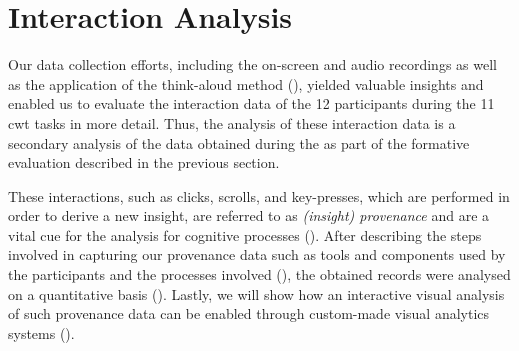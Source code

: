 \section{Interaction Analysis} \label{sec:interaction-analysis}
Our data collection efforts, including the on-screen and audio recordings as well as the application of the think-aloud method (), yielded valuable insights and enabled us to evaluate the interaction data of the 12 participants during the 11 \acrshort{cwt} tasks in more detail. 
%
Thus, the analysis of these interaction data is a secondary analysis of the data obtained during the  as part of the formative evaluation described in the previous section.


These interactions, such as clicks, scrolls, and key-presses, which are performed in order to derive a new insight, are referred to as \emph{(insight) provenance} \cite{gotz2009characterizing} and are a vital cue for the analysis for cognitive processes ().
%
After describing the steps involved in capturing our provenance data such as tools and components used by the participants and the processes involved (), the obtained records were analysed on a quantitative basis (). 
%
Lastly, we will show how an interactive visual analysis of such provenance data can be enabled through custom-made visual analytics systems ().


